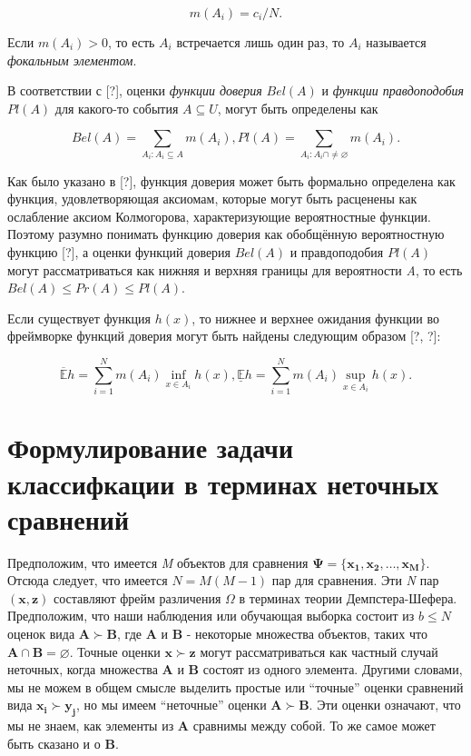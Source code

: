 \documentclass[12pt,a4paper,oneside]{article}
\begin{document}
\[
m(A_i) = c_i / N.
\]

\par
Если \(m(A_i) > 0\), то есть \(A_i\) встречается лишь один раз, то \(A_i\) называется \emph{фокальным элементом}. 

\par
В соответствии с [?], оценки \emph{функции доверия} \(Bel(A)\) и \emph{функции правдоподобия} \(Pl(A)\) для какого-то события \(A \subseteq U\), могут быть определены как

\[
Bel(A) = \sum \limits_{A_i: A_i \subseteq A} m(A_i), 
Pl(A) = \sum \limits_{A_i: A_i \cap \neq \varnothing} m(A_i).
\]

Как было указано в [?], функция доверия может быть формально определена как функция, удовлетворяющая аксиомам, которые могут быть расценены как ослабление аксиом Колмогорова, характеризующие вероятностные функции. 
Поэтому разумно понимать функцию доверия как обобщённую вероятностную функцию [?], а оценки функций доверия \(Bel(A)\) и правдоподобия \(Pl(A)\) могут рассматриваться как нижняя и верхняя границы для вероятности \emph{A}, то есть \(Bel(A) \leq Pr(A) \leq Pl(A)\).

\par
Если существует функция \(h(x)\), то нижнее и верхнее ожидания функции во фреймворке функций доверия могут быть найдены следующим образом [?, ?]:

\[
\mathbb{\overline{E}} h = \sum \limits_{i=1}^N m(A_i) \inf_{x \in A_i} h(x), 
\mathbb{\underline{E}} h = \sum \limits_{i=1}^N m(A_i) \sup_{x \in A_i} h(x).
\]

\section{Формулирование задачи классифкации в терминах неточных сравнений}
\label{sec:classification_problem_by_imprecise_comparisons}

\par
Предположим, что имеется \emph{M} объектов для сравнения \(\mathbf{\Psi} = \{\mathbf{x_1}, \mathbf{x_2}, \dots, \mathbf{x_M}\}\). 
Отсюда следует, что имеется \(N = M(M - 1)\) пар для сравнения. 
Эти \emph{N} пар \((\mathbf{x}, \mathbf{z})\) составляют фрейм различения \(\Omega\) в терминах теории Демпстера-Шефера. 
Предположим, что наши наблюдения или обучающая выборка состоит из \(b \leq N\) оценок вида \(\mathbf{A} \succ \mathbf{B}\), где \(\mathbf{A}\) и \(\mathbf{B}\) - некоторые множества объектов, таких что \(\mathbf{A} \cap \mathbf{B} = \varnothing\).  
Точные оценки \(\mathbf{x} \succ \mathbf{z}\) могут рассматриваться как частный случай неточных, когда множества \(\mathbf{A}\) и \(\mathbf{B}\) состоят из одного элемента. 
Другими словами, мы не можем в общем смысле выделить простые или ``точные'' оценки сравнений вида \(\mathbf{x_i} \succ \mathbf{y_j}\), но мы имеем ``неточные'' оценки \(\mathbf{A} \succ \mathbf{B}\). 
Эти оценки означают, что мы не знаем, как элементы из \(\mathbf{A}\) сравнимы между собой. 
То же самое может быть сказано и о \(\mathbf{B}\). 
\end{document}
